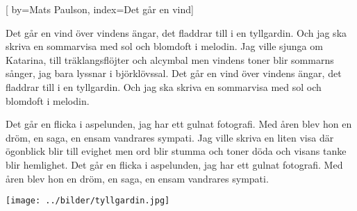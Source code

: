


[ 	%
	by={Mats Paulson},
	index={Det går en vind}]		%
	
\beginverse*		%
Det går en vind över vindens ängar,
det fladdrar till i en tyllgardin.
Och jag ska skriva en sommarvisa
med sol och blomdoft i melodin.
Jag ville sjunga om Katarina,
till träklangsflöjter och alcymbal
men vindens toner blir sommarns sånger,
jag bara lyssnar i björklövssal.
Det går en vind över vindens ängar,
det fladdrar till i en tyllgardin.
Och jag ska skriva en sommarvisa
med sol och blomdoft i melodin.
\endverse			%

\beginverse*		%
Det går en flicka i aspelunden,
jag har ett gulnat fotografi.
Med åren blev hon en dröm, en saga,
en ensam vandrares sympati.
Jag ville skriva en liten visa
där ögonblick blir till evighet
men ord blir stumma och toner döda
och visans tanke blir hemlighet.
Det går en flicka i aspelunden,
jag har ett gulnat fotografi.
Med åren blev hon en dröm, en saga,
en ensam vandrares sympati.
\endverse			%
\endsong			%

\begin{intersong}
\begin{center}
\texttt{[image: ../bilder/tyllgardin.jpg]} 
\end{center}
\end{intersong}
